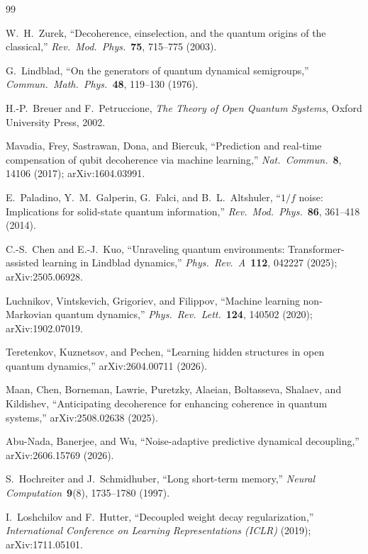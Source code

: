 \documentclass[twocolumn,10pt]{article}
\begin{document}

\begin{thebibliography}{99}

W.~H.~Zurek,
``Decoherence, einselection, and the quantum origins of the
  classical,''
\textit{Rev.\ Mod.\ Phys.}\ \textbf{75}, 715--775 (2003).

G.~Lindblad,
``On the generators of quantum dynamical semigroups,''
\textit{Commun.\ Math.\ Phys.}\ \textbf{48}, 119--130 (1976).

H.-P.~Breuer and F.~Petruccione,
\textit{The Theory of Open Quantum Systems},
Oxford University Press, 2002.

Mavadia, Frey, Sastrawan, Dona, and Biercuk,
``Prediction and real-time compensation of qubit decoherence via machine
  learning,''
\textit{Nat.\ Commun.}\ \textbf{8}, 14106 (2017); arXiv:1604.03991.

E.~Paladino, Y.~M.~Galperin, G.~Falci, and B.~L.~Altshuler,
``$1/f$ noise: Implications for solid-state quantum information,''
\textit{Rev.\ Mod.\ Phys.}\ \textbf{86}, 361--418 (2014).

C.-S.~Chen and E.-J.~Kuo,
``Unraveling quantum environments: Transformer-assisted learning in
  Lindblad dynamics,''
\textit{Phys.\ Rev.\ A}\ \textbf{112}, 042227 (2025); arXiv:2505.06928.

Luchnikov, Vintskevich, Grigoriev, and Filippov,
``Machine learning non-Markovian quantum dynamics,''
\textit{Phys.\ Rev.\ Lett.}\ \textbf{124}, 140502 (2020); arXiv:1902.07019.

Teretenkov, Kuznetsov, and Pechen,
``Learning hidden structures in open quantum dynamics,''
arXiv:2604.00711 (2026).

Maan, Chen, Borneman, Lawrie, Puretzky, Alaeian, Boltasseva, Shalaev, and
Kildishev,
``Anticipating decoherence for enhancing coherence in quantum systems,''
arXiv:2508.02638 (2025).

Abu-Nada, Banerjee, and Wu,
``Noise-adaptive predictive dynamical decoupling,''
arXiv:2606.15769 (2026).

S.~Hochreiter and J.~Schmidhuber,
``Long short-term memory,''
\textit{Neural Computation}\ \textbf{9}(8), 1735--1780 (1997).

I.~Loshchilov and F.~Hutter,
``Decoupled weight decay regularization,''
\textit{International Conference on Learning Representations (ICLR)}
  (2019); arXiv:1711.05101.


\end{thebibliography}
\end{document}
